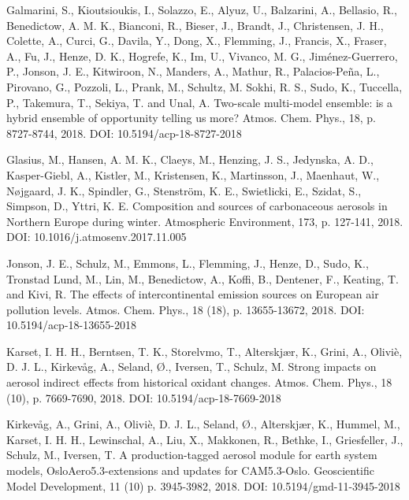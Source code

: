 \begin{list}{}{\setlength{\leftmargin}{15pt}\setlength{\itemindent}{-\leftmargin}}
\item[]
Galmarini, S., Kioutsioukis, I., Solazzo, E., Alyuz, U., Balzarini, A., Bellasio, R., Benedictow, A. M. K., Bianconi, R., Bieser, J., Brandt, J., Christensen, J. H., Colette, A., Curci, G., Davila, Y., Dong, X., Flemming, J., Francis, X., Fraser, A., Fu, J., Henze, D. K., Hogrefe, K., Im, U., Vivanco, M. G., Jim{\'e}nez-Guerrero, P., Jonson, J. E., Kitwiroon, N., Manders, A., Mathur, R., Palacios-Pe{\~n}a, L., Pirovano, G., Pozzoli, L., Prank, M., Schultz, M. Sokhi, R. S., Sudo, K., Tuccella, P., Takemura, T., Sekiya, T. and Unal, A.
Two-scale multi-model ensemble: is a hybrid ensemble of opportunity telling us more?
Atmos. Chem. Phys., 18, p. 8727-8744, 2018.
DOI: 10.5194/acp-18-8727-2018

\item[]
Glasius, M., Hansen, A. M. K., Claeys, M., Henzing, J. S., Jedynska, A. D., Kasper-Giebl, A., Kistler, M., Kristensen, K., Martinsson, J., Maenhaut, W., N{\o}jgaard, J. K., Spindler, G., Stenstr{\"o}m, K. E., Swietlicki, E., Szidat, S., Simpson, D., Yttri, K. E. 
Composition and sources of carbonaceous aerosols in Northern Europe during winter. 
Atmospheric Environment, 173, p. 127-141, 2018.
DOI: 10.1016/j.atmosenv.2017.11.005

\item[]
Jonson, J. E., Schulz, M., Emmons, L., Flemming, J., Henze, D., Sudo, K., Tronstad Lund, M., Lin, M., Benedictow, A., Koffi, B., Dentener, F., Keating, T. and Kivi, R.
The effects of intercontinental emission  sources  on  European  air  pollution  levels.
Atmos. Chem. Phys., 18 (18), p. 13655-13672, 2018.
DOI: 10.5194/acp-18-13655-2018

\item[]
Karset, I. H. H., Berntsen, T. K., Storelvmo, T., Alterskj{\ae}r, K., Grini, A., Olivi{\`e}, D. J. L., Kirkev{\aa}g, A., Seland, {\O}., Iversen, T., Schulz, M. 
 Strong impacts on aerosol indirect effects from historical oxidant changes. 
Atmos. Chem. Phys., 18 (10), p. 7669-7690, 2018.
DOI: 10.5194/acp-18-7669-2018

\item[]
Kirkev{\aa}g, A., Grini, A., Olivi{\`e}, D. J. L., Seland, {\O}., Alterskj{\ae}r, K., Hummel, M., Karset, I. H. H., Lewinschal, A., Liu, X., Makkonen, R., Bethke, I., Griesfeller, J., Schulz, M., Iversen, T. 
A production-tagged aerosol module for earth system models, OsloAero5.3-extensions and updates for CAM5.3-Oslo. 
Geoscientific Model Development, 11 (10) p. 3945-3982, 2018. 
DOI: 10.5194/gmd-11-3945-2018


\end{list}
